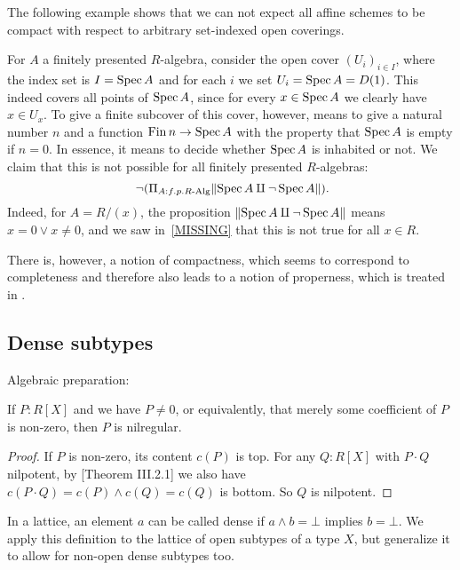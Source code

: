 The following example shows that we can not expect all affine schemes
to be compact with respect to arbitrary set-indexed open coverings.

\begin{example}
  For $A$ a finitely presented $R$-algebra,
  consider the open cover ${(U_i)}_{i \in I}$,
  where the index set is $I = \operatorname{Spec} A$
  and for each $i$ we set $U_i = \operatorname{Spec} A = D(1)$.
  This indeed covers all points of $\operatorname{Spec} A$,
  since for every $x \in \operatorname{Spec} A$ we clearly have $x \in U_x$.
  To give a finite subcover of this cover, however,
  means to give a natural number $n$ and a function $\operatorname{Fin} n \to \operatorname{Spec} A$
  with the property that $\operatorname{Spec} A$ is empty if $n = 0$.
  In essence, it means to decide whether $\operatorname{Spec} A$ is inhabited or not.
  We claim that this is not possible for all finitely presented $R$-algebras:
  \[ \lnot (\Pi_{A : f.p. R\text{-Alg}} \propTrunc{\Spec A \amalg \lnot \Spec A} )
     \rlap{.} \]
  Indeed, for $A = R/(x)$,
  the proposition $\lVert \operatorname{Spec} A \amalg \lnot \operatorname{Spec} A \rVert$
  means $x = 0 \lor x \neq 0$,
  and we saw in~\ref{MISSING} that this is not true for all $x \in R$.
\end{example}

There is, however, a notion of compactness, which seems to correspond to completeness and therefore also leads to a notion of properness,
which is treated in \cite{proper-draft}.


\subsection{Dense subtypes}

Algebraic preparation:

\begin{lemma}%
  \label{nilregular-non-zero-polynomial}
  If $P:R[X]$ and we have $P\neq 0$, or equivalently,
  that merely some coefficient of $P$ is non-zero,
  then $P$ is nilregular.
\end{lemma}

\begin{proof}
  If $P$ is non-zero, its content $c(P)$ is top.
  For any $Q:R[X]$ with $P\cdot Q$ nilpotent,
  by \cite{lombardi-quitte}[Theorem III.2.1] we also have $c(P\cdot Q)=c(P)\wedge c(Q)=c(Q)$ is bottom.
  So $Q$ is nilpotent.
\end{proof}

In a lattice,
an element $a$ can be called dense
if $a \wedge b = \bot$ implies $b = \bot$.
We apply this definition to the lattice of open subtypes of a type $X$,
but generalize it to allow for non-open dense subtypes too.

